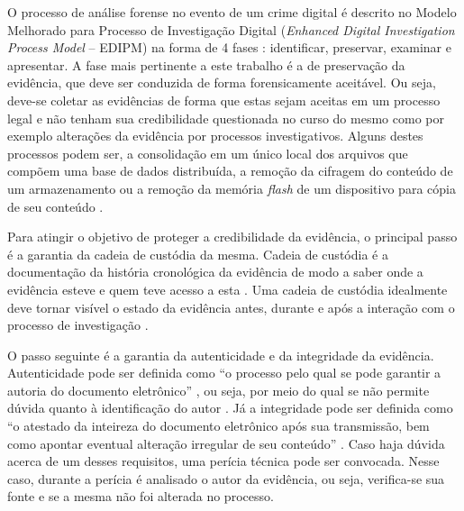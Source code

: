 O processo de análise forense no evento de um crime digital é descrito no Modelo Melhorado para Processo de Investigação Digital (\textit{Enhanced Digital Investigation Process Model} -- EDIPM) na forma de 4 fases \cite{GrisposChallengesCloudComputing:2012}: identificar, preservar, examinar e apresentar.
%
A fase mais pertinente a este trabalho é a de preservação da evidência, que deve ser conduzida de forma forensicamente aceitável.
%
Ou seja, deve-se coletar as evidências de forma que estas sejam aceitas em um processo legal e não tenham sua credibilidade questionada no curso do mesmo como por exemplo alterações da evidência por processos investigativos.
%
Alguns destes processos podem ser, a consolidação em um único local dos arquivos que compõem uma base de dados distribuída, a remoção da cifragem do conteúdo de um armazenamento ou a remoção da memória \textit{flash} de um dispositivo para cópia de seu conteúdo \cite{LuisDigitalChainOfCustody:2016}.
%

Para atingir o objetivo de proteger a credibilidade da evidência, o principal passo é a garantia da cadeia de custódia da mesma.
%
Cadeia de custódia é a documentação da história cronológica da evidência de modo a saber onde a evidência esteve e quem teve acesso a esta \cite[p.~21]{Ramos:2011}. 
%
Uma cadeia de custódia idealmente deve tornar visível o estado da evidência antes, durante e após a interação com o processo de investigação \cite{LuisDigitalChainOfCustody:2016}.
%
%


O passo seguinte é a garantia da autenticidade e da integridade da evidência.
%
Autenticidade pode ser definida como ``o processo pelo qual se pode garantir a autoria do documento eletrônico'' \cite[p.~21]{Ramos:2011}, ou seja, por meio do qual se não permite dúvida quanto à identificação do autor .
%
Já a integridade pode ser definida como ``o atestado da inteireza do documento eletrônico após sua transmissão, bem como apontar eventual alteração irregular de seu conteúdo'' \cite[p.~21]{Ramos:2011}. 
%
Caso haja dúvida acerca de um desses requisitos, uma perícia técnica pode ser convocada.
%
Nesse caso, durante a perícia é analisado o autor da evidência, ou seja, verifica-se sua fonte e se a mesma não foi alterada no processo.


